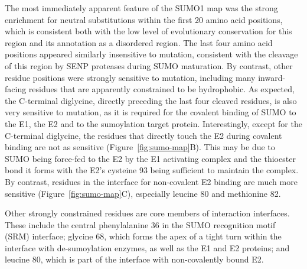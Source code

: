 The most immediately apparent feature of the SUMO1 map was the strong enrichment for neutral substitutions within the first 20 amino acid positions, which is consistent both with the low level of evolutionary conservation for this region and its annotation as a disordered region. The last four amino acid positions appeared similarly insensitive to mutation, consistent with the cleavage of this region by SENP proteases during SUMO maturation. By contrast, other residue positions were strongly sensitive to mutation, including many inward-facing residues that are apparently constrained to be hydrophobic. As expected, the C-terminal diglycine, directly preceding the last four cleaved residues, is also very sensitive to mutation, as it is required for the covalent binding of SUMO to the E1, the E2 and to the sumoylation target protein. Interestingly, except for the C-terminal diglycine, the residues that directly touch the E2 during covalent binding are not as sensitive (Figure~\ref{fig:sumo-map}B). This may be due to  SUMO being force-fed to the E2 by the E1 activating complex and the thioester bond it forms with the E2's cysteine 93 being sufficient to maintain the complex. By contrast, residues in the interface for non-covalent E2 binding are much more sensitive (Figure~\ref{fig:sumo-map}C), especially leucine 80 and methionine 82.

Other strongly constrained residues are core members of interaction interfaces. These include the central phenylalanine 36 in the SUMO recognition motif (SRM) interface; glycine 68, which forms the apex of a tight turn within the interface with de-sumoylation enzymes, as well as the E1 and E2 proteins; and leucine 80, which is part of the interface with non-covalently bound E2. 

